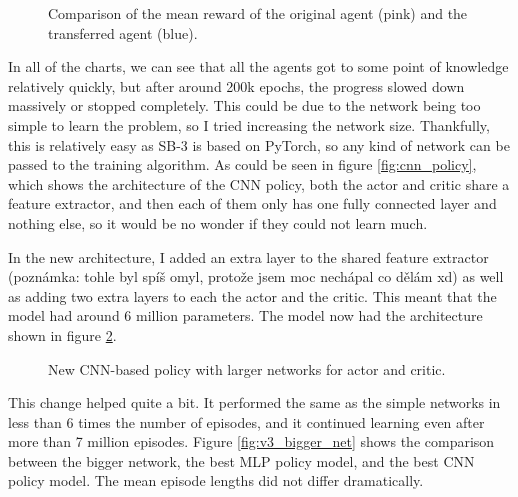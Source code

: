 \documentclass[
  digital,     %
  oneside,     %
  nosansbold,  %
  nocolorbold, %
  lof,         %
  lot,         %
]{fithesis4}
\begin{document}
\begin{figure}
    \centering
    \makebox[\textwidth][c]{}
    \caption{Comparison of the mean reward of the original agent (pink) and the transferred agent (blue).}
    \label{fig:v3_transfer}
\end{figure}

In all of the charts, we can see that all the agents got to some point of knowledge relatively quickly, but after around 200k epochs, the progress slowed down massively or stopped completely. This could be due to the network being too simple to learn the problem, so I tried increasing the network size. Thankfully, this is relatively easy as SB-3 is based on PyTorch, so any kind of network can be passed to the training algorithm. As could be seen in figure \ref{fig:cnn_policy}, which shows the architecture of the CNN policy, both the actor and critic share a feature extractor, and then each of them only has one fully connected layer and nothing else, so it would be no wonder if they could not learn much.

In the new architecture, I added an extra layer to the shared feature extractor (poznámka: tohle byl spíš omyl, protože jsem moc nechápal co dělám xd) as well as adding two extra layers to each the actor and the critic. This meant that the model had around 6 million parameters. The model now had the architecture shown in figure \ref{fig:bigger_net_policy}.

\begin{figure}
    \caption{New CNN-based policy with larger networks for actor and critic.}
    \label{fig:bigger_net_policy}
\end{figure}

This change helped quite a bit. It performed the same as the simple networks in less than 6 times the number of episodes, and it continued learning even after more than 7 million episodes. Figure \ref{fig:v3_bigger_net} shows the comparison between the bigger network, the best MLP policy model, and the best CNN policy model. The mean episode lengths did not differ dramatically.
\end{document}
